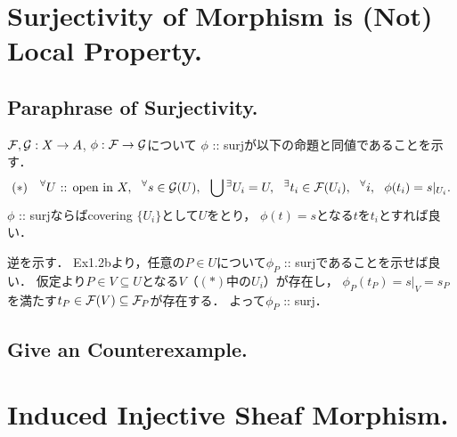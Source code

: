 \documentclass[a4paper]{jsarticle}
\begin{document}
    \section{Surjectivity of Morphism is (Not) Local Property.} %
    \subsection{Paraphrase of Surjectivity.}
    $\mathcal{F}, \mathcal{G}: X \to A$, $\phi: \mathcal{F} \to \mathcal{G}$について
    $\phi$ :: surjが以下の命題と同値であることを示す．
    \[
        (*)~~~
        {}^{\forall} U \text{ :: open in } X,~~
        {}^{\forall} s \in \mathcal{G}(U),~~
        \bigcup {}^\exists U_i=U,~~
        {}^{\exists} t_i \in \mathcal{F}(U_i),~~
        {}^{\forall} i,~~ \phi(t_i)=s|_{U_i}.
    \]
    $\phi$ :: surjならばcovering $\{U_i\}$として$U$をとり，
    $\phi(t)=s$となる$t$を$t_i$とすれば良い．

    逆を示す．
    Ex1.2bより，任意の$P \in U$について$\phi_P$ :: surjであることを示せば良い．
    仮定より$P \in V \subseteq U$となる$V$（$(*)$中の$U_i$）が存在し，
    $\phi_P(t_P)=s|_V=s_P$を満たす$t_P \in \mathcal{F}(V) \subseteq \mathcal{F}_P$が存在する．
    よって$\phi_P$ :: surj．

    \subsection{Give an Counterexample.}



\section{Induced Injective Sheaf Morphism.} %
\end{document}
